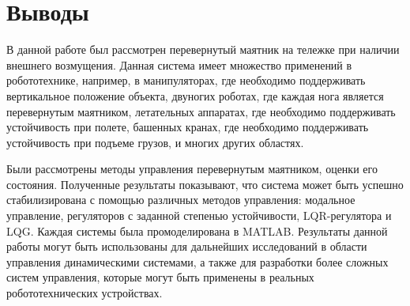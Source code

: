 
\FloatBarrier

\FloatBarrier

\FloatBarrier

\FloatBarrier

\FloatBarrier


\FloatBarrier
\section{Выводы}
В данной работе был рассмотрен перевернутый маятник на тележке при наличии внешнего возмущения. 
Данная система имеет множество применений в робототехнике, например, в манипуляторах, где необходимо поддерживать вертикальное положение объекта, 
двуногих роботах, где каждая нога является перевернутым маятником, летательных аппаратах, где необходимо поддерживать устойчивость при полете, 
башенных кранах, где необходимо поддерживать устойчивость при подъеме грузов, и многих других областях.  

Были рассмотрены методы управления перевернутым маятником, оценки его состояния. Полученные результаты 
показывают, что система может быть успешно стабилизирована с помощью различных методов управления: 
модальное управление, регуляторов с заданной степенью устойчивости, LQR-регулятора и LQG. 
Каждая системы была промоделирована в MATLAB. Результаты данной работы могут быть использованы для дальнейших исследований в области управления динамическими системами,
а также для разработки более сложных систем управления, которые могут быть применены в реальных робототехнических устройствах.